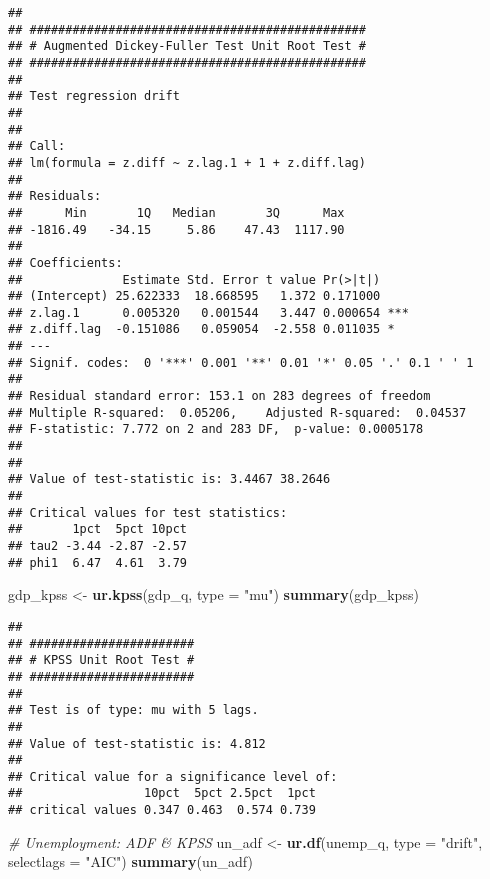 \documentclass[
]{article}
\newenvironment{Shaded}{\begin{snugshade}}{\end{snugshade}}
\newcommand{\AttributeTok}[1]{\textcolor[rgb]{0.13,0.29,0.53}{#1}}
\newcommand{\CommentTok}[1]{\textcolor[rgb]{0.56,0.35,0.01}{\textit{#1}}}
\newcommand{\FunctionTok}[1]{\textcolor[rgb]{0.13,0.29,0.53}{\textbf{#1}}}
\newcommand{\NormalTok}[1]{#1}
\newcommand{\OtherTok}[1]{\textcolor[rgb]{0.56,0.35,0.01}{#1}}
\newcommand{\StringTok}[1]{\textcolor[rgb]{0.31,0.60,0.02}{#1}}
\begin{document}
\begin{verbatim}
## 
## ############################################### 
## # Augmented Dickey-Fuller Test Unit Root Test # 
## ############################################### 
## 
## Test regression drift 
## 
## 
## Call:
## lm(formula = z.diff ~ z.lag.1 + 1 + z.diff.lag)
## 
## Residuals:
##      Min       1Q   Median       3Q      Max 
## -1816.49   -34.15     5.86    47.43  1117.90 
## 
## Coefficients:
##              Estimate Std. Error t value Pr(>|t|)    
## (Intercept) 25.622333  18.668595   1.372 0.171000    
## z.lag.1      0.005320   0.001544   3.447 0.000654 ***
## z.diff.lag  -0.151086   0.059054  -2.558 0.011035 *  
## ---
## Signif. codes:  0 '***' 0.001 '**' 0.01 '*' 0.05 '.' 0.1 ' ' 1
## 
## Residual standard error: 153.1 on 283 degrees of freedom
## Multiple R-squared:  0.05206,    Adjusted R-squared:  0.04537 
## F-statistic: 7.772 on 2 and 283 DF,  p-value: 0.0005178
## 
## 
## Value of test-statistic is: 3.4467 38.2646 
## 
## Critical values for test statistics: 
##       1pct  5pct 10pct
## tau2 -3.44 -2.87 -2.57
## phi1  6.47  4.61  3.79
\end{verbatim}

\begin{Shaded}
\begin{Highlighting}[]
\NormalTok{gdp\_kpss }\OtherTok{\textless{}{-}} \FunctionTok{ur.kpss}\NormalTok{(gdp\_q, }\AttributeTok{type =} \StringTok{"mu"}\NormalTok{)}
\FunctionTok{summary}\NormalTok{(gdp\_kpss)}
\end{Highlighting}
\end{Shaded}

\begin{verbatim}
## 
## ####################### 
## # KPSS Unit Root Test # 
## ####################### 
## 
## Test is of type: mu with 5 lags. 
## 
## Value of test-statistic is: 4.812 
## 
## Critical value for a significance level of: 
##                 10pct  5pct 2.5pct  1pct
## critical values 0.347 0.463  0.574 0.739
\end{verbatim}

\begin{Shaded}
\begin{Highlighting}[]
\CommentTok{\# Unemployment: ADF \& KPSS}
\NormalTok{un\_adf   }\OtherTok{\textless{}{-}} \FunctionTok{ur.df}\NormalTok{(unemp\_q, }\AttributeTok{type =} \StringTok{"drift"}\NormalTok{, }\AttributeTok{selectlags =} \StringTok{"AIC"}\NormalTok{)}
\FunctionTok{summary}\NormalTok{(un\_adf)}
\end{Highlighting}
\end{Shaded}
\end{document}
